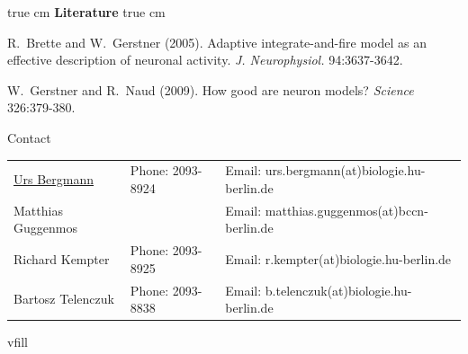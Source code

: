 \documentclass[12pt]{article}
\begin{document}
 true cm
{\bf Literature}
 true cm

R.~Brette and W.~Gerstner (2005). Adaptive integrate-and-fire model as an
effective description of neuronal activity.
\emph{J. Neurophysiol.} 94:3637-3642.\newline

W.~Gerstner and R.~Naud (2009). How good are neuron models?
\emph{Science} 326:379-380.\newline

\vfill
\centerline{\CAP Contact}
\CAP

\begin{tabular}{lll}
\underline{Urs Bergmann} & Phone: 2093-8924 & Email:
urs.bergmann(at)biologie.hu-berlin.de \\
Matthias Guggenmos & & Email: matthias.guggenmos(at)bccn-berlin.de \\
Richard Kempter \hfill & Phone: 2093-8925 \hfill & Email:
r.kempter(at)biologie.hu-berlin.de \\
Bartosz Telenczuk & Phone: 2093-8838 & Email:
b.telenczuk(at)biologie.hu-berlin.de \\
\end{tabular}vfill
\end{document}
